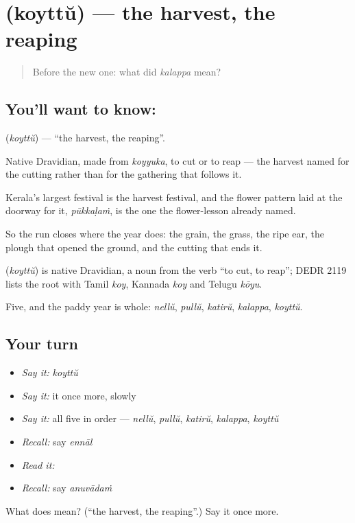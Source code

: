 \section[\texorpdfstring{\ml{കൊയ്ത്ത്} (koyttŭ)}{കൊയ്ത്ത് (koyttŭ)}]{ (koyttŭ) — the harvest, the reaping}

\label{lesson:ML-C66-harvest}



\begin{quote}
Before the new one: what did \emph{kalappa} mean?
\end{quote}

\subsection*{You'll want to know: }
\textbf{} (\emph{koyttŭ}) — \textquotedblleft{}the harvest, the reaping\textquotedblright{}.

Native Dravidian, made from \emph{koyyuka}, to cut or to reap — the harvest named for the cutting rather than for the gathering that follows it.

Kerala's largest festival is the harvest festival, and the flower pattern laid at the doorway for it, \emph{pūkkaḷaṁ}, is the one the flower-lesson already named.

So the run closes where the year does: the grain, the grass, the ripe ear, the plough that opened the ground, and the cutting that ends it.

\begin{cousinweb}
\textbf{} (\emph{koyttŭ}) is native Dravidian, a noun from the verb \textquotedblleft{}to cut, to reap\textquotedblright{}; DEDR 2119 lists the root with Tamil \emph{koy}, Kannada \emph{koy} and Telugu \emph{kōyu}.
\end{cousinweb}

\begin{grammarlens}[title={What you've built}]
Five, and the paddy year is whole: \emph{nellŭ}, \emph{pullŭ}, \emph{katirŭ}, \emph{kalappa}, \emph{koyttŭ}.
\end{grammarlens}

\subsection*{Your turn}
\begin{itemize}
\raggedright
  \item \emph{Say it:} \emph{koyttŭ}
  \item \emph{Say it:} it once more, slowly
  \item \emph{Say it:} all five in order — \emph{nellŭ}, \emph{pullŭ}, \emph{katirŭ}, \emph{kalappa}, \emph{koyttŭ}
  \item \emph{Recall:} say \emph{ennāl}
  \item \emph{Read it:} \textbf{}
  \item \emph{Recall:} say \emph{anuvādaṁ}
\end{itemize}

\begin{tcolorbox}[breakable,colback=teal!4,colframe=teal!35!black,title={Before you move on}]
What does  mean? (\textquotedblleft{}the harvest, the reaping\textquotedblright{}.) Say it once more.
\end{tcolorbox}
